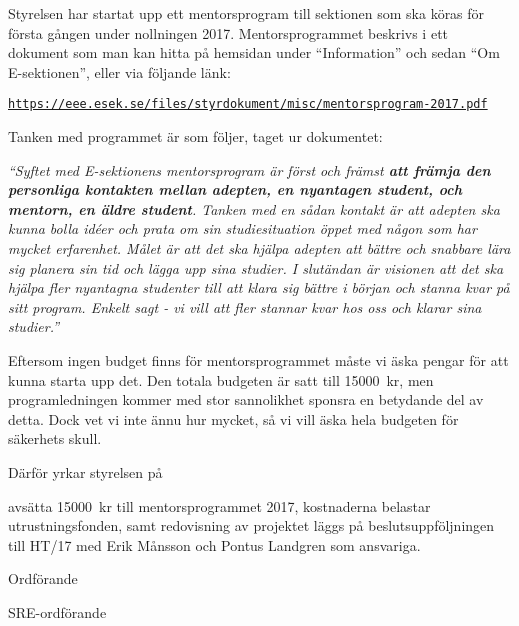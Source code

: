 \documentclass[../_main/handlingar.tex]{subfiles}
\begin{document}

Styrelsen har startat upp ett mentorsprogram till sektionen som ska köras för första gången under nollningen 2017. Mentorsprogrammet beskrivs i ett dokument som man kan hitta på hemsidan under ``Information'' och sedan ``Om E-sektionen'', eller via följande länk:

\href{https://eee.esek.se/files/styrdokument/misc/mentorsprogram-2017.pdf}{\texttt{https://eee.esek.se/files/styrdokument/misc/mentorsprogram-2017.pdf}}

Tanken med programmet är som följer, taget ur dokumentet:

\textit{``Syftet med E-sektionens mentorsprogram är först och främst \textbf{att främja den personliga kontakten mellan adepten, en nyantagen student, och mentorn, en äldre student}.
Tanken med en sådan kontakt är att adepten ska kunna bolla idéer och prata om sin studiesituation öppet med någon som har mycket erfarenhet.
Målet är att det ska hjälpa adepten att bättre och snabbare lära sig planera sin tid och lägga upp sina studier.
I slutändan är visionen att det ska hjälpa fler nyantagna studenter till att klara sig bättre i början och stanna kvar på sitt program.
Enkelt sagt - vi vill att fler stannar kvar hos oss och klarar sina studier.''}


Eftersom ingen budget finns för mentorsprogrammet måste vi äska pengar för att kunna starta upp det. Den totala budgeten är satt till \SI{15000}{kr}, men programledningen kommer med stor sannolikhet sponsra en betydande del av detta. Dock vet vi inte ännu hur mycket, så vi vill äska hela budgeten för säkerhets skull.

Därför yrkar styrelsen på

\begin{attsatser}
    \att avsätta \SI{15000}{kr} till mentorsprogrammet 2017,
    \att kostnaderna belastar utrustningsfonden, samt
    \att redovisning av projektet läggs på beslutsuppföljningen till HT/17 med Erik Månsson och Pontus Landgren som ansvariga.
\end{attsatser}

\begin{signatures}{2}
    \ist
    \signature{\ordf}{Ordförande}
    \signature{\sreordf}{SRE-ordförande}
\end{signatures}
\end{document}
